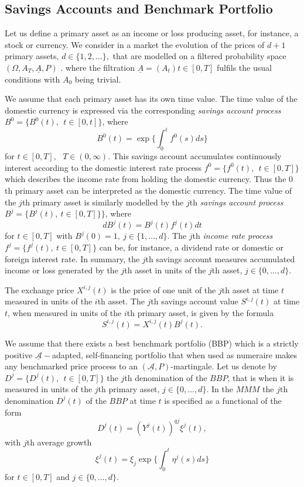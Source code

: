 \documentclass[a4 paper, 12pt]{report}
\theoremstyle{plain}
\begin{document}
\subsection{Savings Accounts and Benchmark Portfolio}
\noindent
\par Let us define a primary asset as an income or loss producing asset, for instance, a
stock or currency. We consider in a market the evolution of the prices of $d + 1$ primary
assets, $d \in \{1, 2,\ldots\},$ that are modelled on a filtered probability space $(\Omega, A_T,\underline{A}, P)$ . where
the filtration $\underline{A} = (A_t)t\in [0,T]$ fulfils the usual conditions with $A_0$ being trivial.\\
\par We assume that each primary asset has its own time value. The time value of the domestic currency is expressed via the corresponding \emph{savings account process} $B^0 = \{B^0(t),~~t\in [0,t]\}$, where
$$
B^0(t) = \exp\bigg\{\int_0^t f^0(s)ds\bigg\}
$$
for $t\in [0,T],~~~T\in(0,\infty)$. This savings account accumulates continuously interest according to the domestic interest rate process $f^0 = \{f^0(t),~~t\in[0,T]\}$ which describes the income rate from holding the domestic currency. Thus the $0$th primary asset can be interpreted as the domestic currency. The time value of the $j$th primary asset is similarly modelled by the $j$th \emph{savings account process} $B^j = \{B^j(t),~t\in[0,T]\}\}$, where
$$
dB^j(t) = B^j(t)f^j(t)dt
$$
for $t\in [0,T]$ with $B^j(0) = 1,~j\in\{1,\ldots,d\}$. The $j$th \emph{income rate process }  $f^j = \{f^j(t),~t\in[0,T]\}$ can be, for instance, a dividend rate or domestic or foreign interest rate. In summary, the $j$th savings account measures accumulated income or loss generated by the $j$th asset in units of the $j$th asset, $j\in\{0,\ldots,d\}.$\\
\par The exchange price $X^{i,j}(t)$ is the price of one unit of the $j$th asset at time $t$ measured in units of the $i$th asset. The $j$th savings account value $S^{i,j}(t)$ at time $t$, when measured in units of the $i$th primary asset, is given by the formula
$$
S^{i,j}(t) = X^{i,j}(t) B^j(t).
$$
\par We assume that there exists a best benchmark portfolio (BBP) which is a strictly positive $\underline{\mathcal{A}}-$adapted, self-financing portfolio that when used as numeraire makes any benchmarked price process to an $(\underline{\mathcal{A}}, P)$-martingale. Let us denote by $D^j = \{D^j(t),~~t\in[0,T]\}$ the $j$th denomination of the $BBP$, that is when it is measured in units of the $j$th primary asset, $j\in\{0,\ldots,d\}$. In the $MMM$ the $j$th denomination $D^j(t)$ of the $BBP$ at time $t$ is specified as a functional of the form
$$
D^j(t) = (Y^j(t))^{qj}\xi^j(t),
$$
with $j$th average growth
$$
\xi^j(t) = \xi_j\exp\bigg\{\int_0^t\eta^j(s)ds\bigg\}
$$
for $t\in [0,T]$ and $j\in\{0,\ldots,d\}$.
\end{document}
